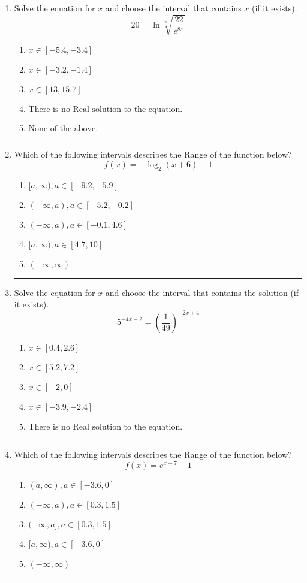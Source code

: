\documentclass[14pt]{extbook}
\newcommand{\litem}[1]{\item#1\hspace*{-1cm}\rule{\textwidth}{0.4pt}}
\begin{document}
\begin{enumerate}
\litem{
 Solve the equation for $x$ and choose the interval that contains $x$ (if it exists).\[  20 = \ln{\sqrt[6]{\frac{22}{e^{8x}}}} \]\begin{enumerate}[label=\Alph*.]
\item \( x \in [-5.4, -3.4] \)
\item \( x \in [-3.2, -1.4] \)
\item \( x \in [13, 15.7] \)
\item \( \text{There is no Real solution to the equation.} \)
\item \( \text{None of the above.} \)

\end{enumerate} }
\litem{
Which of the following intervals describes the Range of the function below?\[ f(x) = -\log_2{(x+6)}-1 \]\begin{enumerate}[label=\Alph*.]
\item \( [a, \infty), a \in [-9.2, -5.9] \)
\item \( (-\infty, a), a \in [-5.2, -0.2] \)
\item \( (-\infty, a), a \in [-0.1, 4.6] \)
\item \( [a, \infty), a \in [4.7, 10] \)
\item \( (-\infty, \infty) \)

\end{enumerate} }
\litem{
Solve the equation for $x$ and choose the interval that contains the solution (if it exists).\[ 5^{-4x-2} = \left(\frac{1}{49}\right)^{-2x+4} \]\begin{enumerate}[label=\Alph*.]
\item \( x \in [0.4, 2.6] \)
\item \( x \in [5.2, 7.2] \)
\item \( x \in [-2, 0] \)
\item \( x \in [-3.9, -2.4] \)
\item \( \text{There is no Real solution to the equation.} \)

\end{enumerate} }
\litem{
Which of the following intervals describes the Range of the function below?\[ f(x) = e^{x-7}-1 \]\begin{enumerate}[label=\Alph*.]
\item \( (a, \infty), a \in [-3.6, 0] \)
\item \( (-\infty, a), a \in [0.3, 1.5] \)
\item \( (-\infty, a], a \in [0.3, 1.5] \)
\item \( [a, \infty), a \in [-3.6, 0] \)
\item \( (-\infty, \infty) \)


\end{enumerate}}
\end{enumerate}
\end{document}
